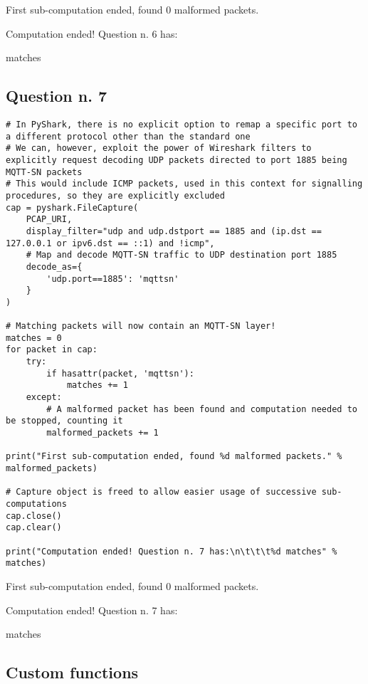 \documentclass[a4paper,11pt]{article} %
\begin{document}
    \begin{tcolorbox}
        First sub-computation ended, found 0 malformed packets.

        Computation ended! Question n. 6 has:

        \qquad \qquad {} matches
    \end{tcolorbox}

    \subsection{Question n. 7}\label{subsec:question-n.-7}

    \begin{verbatim}
# In PyShark, there is no explicit option to remap a specific port to a different protocol other than the standard one
# We can, however, exploit the power of Wireshark filters to explicitly request decoding UDP packets directed to port 1885 being MQTT-SN packets
# This would include ICMP packets, used in this context for signalling procedures, so they are explicitly excluded
cap = pyshark.FileCapture(
    PCAP_URI,
    display_filter="udp and udp.dstport == 1885 and (ip.dst == 127.0.0.1 or ipv6.dst == ::1) and !icmp",
    # Map and decode MQTT-SN traffic to UDP destination port 1885
    decode_as={
        'udp.port==1885': 'mqttsn'
    }
)

# Matching packets will now contain an MQTT-SN layer!
matches = 0
for packet in cap:
    try:
        if hasattr(packet, 'mqttsn'):
            matches += 1
    except:
        # A malformed packet has been found and computation needed to be stopped, counting it
        malformed_packets += 1

print("First sub-computation ended, found %d malformed packets." % malformed_packets)

# Capture object is freed to allow easier usage of successive sub-computations
cap.close()
cap.clear()

print("Computation ended! Question n. 7 has:\n\t\t\t%d matches" % matches)
    \end{verbatim}

    \begin{tcolorbox}
        First sub-computation ended, found 0 malformed packets.

        Computation ended! Question n. 7 has:

        \qquad \qquad {} matches
    \end{tcolorbox}

    \subsection{Custom functions}
\end{document}

